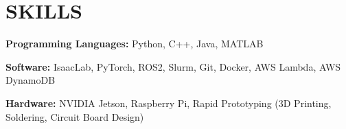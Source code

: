 \documentclass[a4paper,9pt]{extarticle}
\begin{document}
\section*{SKILLS}
\textbf{Programming Languages:} Python, C++, Java, MATLAB 

\noindent
\textbf{Software:} IsaacLab, PyTorch, ROS2, Slurm, Git, Docker, AWS Lambda, AWS DynamoDB

\noindent 
\textbf{Hardware:} NVIDIA Jetson, Raspberry Pi, Rapid Prototyping (3D Printing, Soldering, Circuit Board Design)





\end{document}
